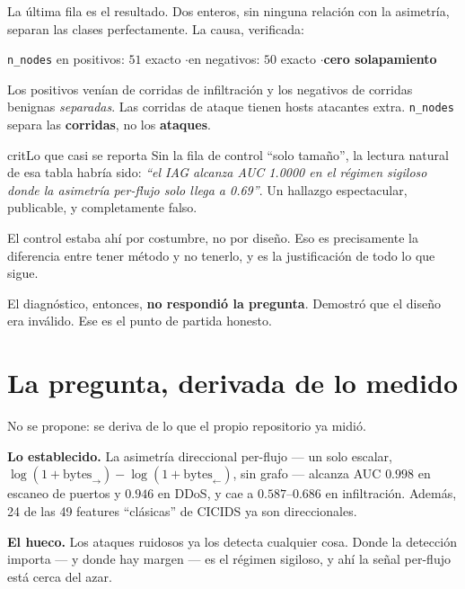\documentclass[11pt]{article}
\newcommand{\code}[1]{\texttt{\small #1}}
\begin{document}
La última fila es el resultado. Dos enteros, sin ninguna relación con la asimetría, separan las clases perfectamente. La causa, verificada:

\begin{center}
\code{n\_nodes} en positivos: $51$ exacto \quad$\cdot$\quad en negativos: $50$ exacto \quad$\cdot$\quad \textbf{cero solapamiento}
\end{center}

Los positivos venían de corridas de infiltración y los negativos de corridas benignas \emph{separadas}. Las corridas de ataque tienen hosts atacantes extra. \code{n\_nodes} separa las \textbf{corridas}, no los \textbf{ataques}.

\begin{cbox}{crit}{Lo que casi se reporta}
Sin la fila de control ``solo tamaño'', la lectura natural de esa tabla habría sido: \emph{``el IAG alcanza AUC 1.0000 en el régimen sigiloso donde la asimetría per-flujo solo llega a 0.69''}. Un hallazgo espectacular, publicable, y completamente falso.

\medskip
El control estaba ahí por costumbre, no por diseño. Eso es precisamente la diferencia entre tener método y no tenerlo, y es la justificación de todo lo que sigue.
\end{cbox}

El diagnóstico, entonces, \textbf{no respondió la pregunta}. Demostró que el diseño era inválido. Ese es el punto de partida honesto.

\section{La pregunta, derivada de lo medido}

No se propone: se deriva de lo que el propio repositorio ya midió.

\textbf{Lo establecido.} La asimetría direccional per-flujo --- un solo escalar, $\log(1+\text{bytes}_\rightarrow) - \log(1+\text{bytes}_\leftarrow)$, sin grafo --- alcanza AUC $0.998$ en escaneo de puertos y $0.946$ en DDoS, y cae a $0.587$--$0.686$ en infiltración. Además, 24 de las 49 features ``clásicas'' de CICIDS ya son direccionales.

\textbf{El hueco.} Los ataques ruidosos ya los detecta cualquier cosa. Donde la detección importa --- y donde hay margen --- es el régimen sigiloso, y ahí la señal per-flujo está cerca del azar.
\end{document}
